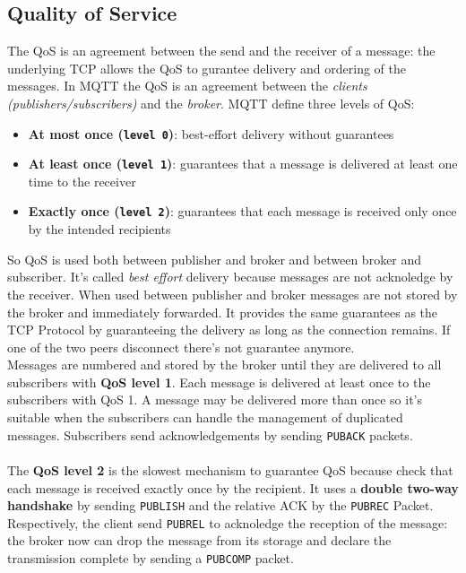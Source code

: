 \documentclass[10pt,a4paper]{report}
\theoremstyle{definition}
\begin{document}
\subsection{Quality of Service}\label{sec:quality-of-service}
The QoS is an agreement between the send and the receiver of a message: the underlying TCP allows the QoS to gurantee delivery and ordering of the messages.
In MQTT the QoS is an agreement between the \textit{clients (publishers/subscribers)} and the \textit{broker}.
MQTT define three levels of QoS:
\begin{itemize}
	\item 
	\textbf{At most once (\texttt{level 0})}: best-effort delivery without guarantees
	\item 
	\textbf{At least once (\texttt{level 1})}: guarantees that a message is delivered at least one time to the receiver
	\item 
	\textbf{Exactly once (\texttt{level 2})}: guarantees that each message is received only once by the intended recipients
	
\end{itemize}
So QoS is used both between publisher and broker and between broker and subscriber.
It's called \textit{best effort} delivery because messages are not acknoledge by the receiver. When used between publisher and broker messages are not stored by the broker and immediately forwarded.
It provides the same guarantees as the TCP Protocol by guaranteeing the delivery as long as the connection remains. If one of the two peers disconnect there's not guarantee anymore.\\
Messages are numbered and stored by the broker until they are delivered to all subscribers with \textbf{QoS level 1}. Each message is delivered at least once to the subscribers with QoS 1. A message may be delivered more than once so it's suitable when the subscribers can handle the management of duplicated messages.
Subscribers send acknowledgements by sending \texttt{PUBACK} packets.\\\\
The \textbf{QoS level 2} is the slowest mechanism to guarantee QoS because check that each message is received exactly once by the recipient. It uses a \textbf{double two-way handshake} by sending \texttt{PUBLISH} and the relative ACK by the \texttt{PUBREC} Packet. Respectively, the client send \texttt{PUBREL} to acknoledge the reception of the message: the broker now can drop the message from its storage and declare the transmission complete by sending a \texttt{PUBCOMP} packet.\\
\end{document}
